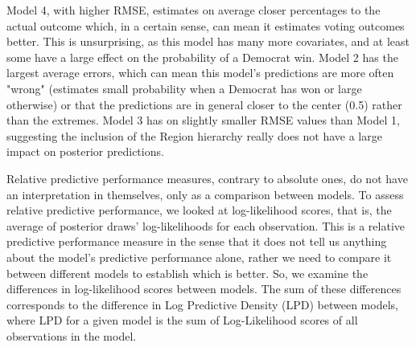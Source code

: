 \documentclass[12pt]{article}
\newcommand{\blue}[1]{\textcolor{blue}{#1}}
\begin{document}
Model 4, with higher RMSE, estimates on average closer percentages to the actual outcome which, in a certain sense, can mean it estimates voting outcomes better. This is unsurprising, as this model has many more covariates, and at least some have a large effect on the probability of a Democrat win.
Model 2 has the largest average errors, which can mean this model's predictions are more often "wrong" (estimates small probability when a Democrat has won or large otherwise) or that the predictions are in general closer to the center (0.5) rather than the extremes. 
Model 3 has on slightly smaller RMSE values than Model 1, suggesting the inclusion of the Region hierarchy really does not have a large impact on posterior predictions.



%
%






Relative predictive performance measures, contrary to absolute ones, do not have an interpretation in themselves, only as a comparison between models. 
To assess relative predictive performance, we looked at log-likelihood scores, that is, the average of posterior draws' log-likelihoods for each observation.
This is a relative predictive performance measure in the sense that it does not tell us anything about the model's predictive performance alone, rather we need to compare it between different models to establish which is better. So, we examine the differences in log-likelihood scores between models.
The sum of these differences corresponds to the difference in Log Predictive Density (LPD) between models, where LPD for a given model is the sum of Log-Likelihood scores of all observations in the model.
\end{document}
